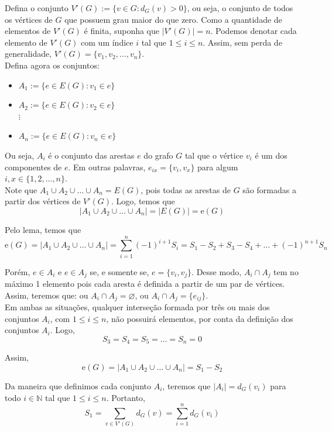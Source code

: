 \documentclass[12pt, a4paper]{article}
\theoremstyle{definition} \newtheorem{prob}{Problema}
\theoremstyle{plain} \newtheorem*{teo}{Teorema}
\begin{document}
Defina o conjunto \(V'(G) := \{v \in G: d_G(v) > 0\}\), ou seja, o conjunto de todos os vértices de \(G\) que possuem grau maior do que zero. Como a quantidade de elementos de \(V'(G)\) é finita, suponha que \( |V'(G)|=n \). Podemos denotar cada elemento de \(V'(G)\) com um índice \(i\) tal que \(1 \leq i \leq n\). Assim, sem perda de generalidade, \(V'(G) = \{v_1, v_2, \ldots, v_n\}\). \\

Defina agora os conjuntos: 
\begin{itemize}
\item \(A_1 := \{e \in E(G): v_1 \in e\}\)

\item \(A_2 := \{e \in E(G): v_2 \in e\}\) \\

\(\vdots\)

\item \(A_n := \{e \in E(G): v_n \in e\}\)
\end{itemize} 

Ou seja, \(A_i\) é o conjunto das arestas \(e\) do grafo \(G\) tal que o vértice \(v_i\) é um dos componentes de \(e\). Em outras palavras, \(e_{ix} = \{v_i, v_x\}\) para algum \(i, x \in \{1, 2, \ldots, n\}\). \\

Note que \(A_1 \cup A_2 \cup \ldots \cup A_n = E(G)\), pois todas as arestas de \(G\) são formadas a partir dos vértices de \(V'(G)\). Logo, temos que \[|A_1 \cup A_2 \cup \ldots \cup A_n| = |E(G)| = \mathrm{e}(G)\]

Pelo lema, temos que \[\mathrm{e}(G)=|A_1 \cup A_2 \cup \ldots \cup A_n| = \sum \limits_{i = 1}^{n} (-1)^{i+1}S_i= S_1 - S_2 + S_3 - S_4 + \ldots + (-1)^{n+1}S_n\]

Porém, \(e \in A_i\) e \(e \in A_j\) se, e somente se, \(e = \{v_i, v_j\}\). Desse modo, \(A_i \cap A_j\) tem no máximo 1 elemento pois cada aresta é definida a partir de um par de vértices. Assim, teremos que: ou \(A_i \cap A_j = \varnothing\), ou \(A_i \cap A_j = \{e_{ij}\}\). \\

Em ambas as situações, qualquer interseção formada por três ou mais dos conjuntos \(A_i\), com \(1 \leq i \leq n\), não possuirá elementos, por conta da definição dos conjuntos \(A_i\). Logo, \[S_3 = S_4 = S_5 = \ldots = S_n = 0\] 

Assim, \[\mathrm{e}(G)=|A_1 \cup A_2 \cup \ldots \cup A_n| = S_1 - S_2\]

Da maneira que definimos cada conjunto \(A_i\), teremos que \(|A_i| = d_G(v_i)\) para todo \(i \in \mathbb{N}\) tal que \(1 \leq i \leq n\). Portanto, \[S_1 = \sum \limits_{v \in V'(G)} d_G(v) = \sum \limits_{i = 1}^{n} d_G(v_i)\]
\end{document}
